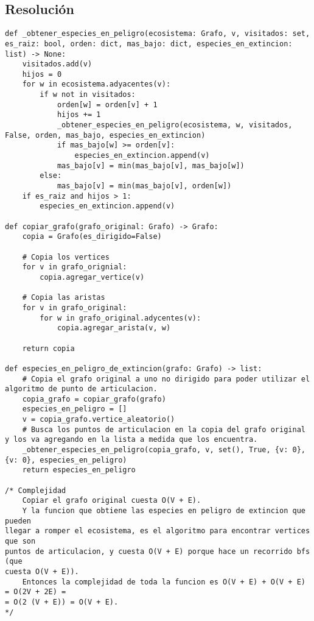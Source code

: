 \documentclass{article}
\begin{document}
\subsection*{Resolución}
\begin{lstlisting}[frame=single]
def _obtener_especies_en_peligro(ecosistema: Grafo, v, visitados: set, es_raiz: bool, orden: dict, mas_bajo: dict, especies_en_extincion: list) -> None:
    visitados.add(v)
    hijos = 0
    for w in ecosistema.adyacentes(v):
        if w not in visitados:
            orden[w] = orden[v] + 1
            hijos += 1
            _obtener_especies_en_peligro(ecosistema, w, visitados, False, orden, mas_bajo, especies_en_extincion)
            if mas_bajo[w] >= orden[v]:
                especies_en_extincion.append(v)
            mas_bajo[v] = min(mas_bajo[v], mas_bajo[w])
        else:
            mas_bajo[v] = min(mas_bajo[v], orden[w])
    if es_raiz and hijos > 1:
        especies_en_extincion.append(v)

def copiar_grafo(grafo_original: Grafo) -> Grafo:
    copia = Grafo(es_dirigido=False)

    # Copia los vertices
    for v in grafo_orignial:
        copia.agregar_vertice(v)

    # Copia las aristas
    for v in grafo_original:
        for w in grafo_original.adycentes(v):
            copia.agregar_arista(v, w)
    
    return copia

def especies_en_peligro_de_extincion(grafo: Grafo) -> list:
    # Copia el grafo original a uno no dirigido para poder utilizar el algoritmo de punto de articulacion.
    copia_grafo = copiar_grafo(grafo) 
    especies_en_peligro = []
    v = copia_grafo.vertice_aleatorio()
    # Busca los puntos de articulacion en la copia del grafo original y los va agregando en la lista a medida que los encuentra.
    _obtener_especies_en_peligro(copia_grafo, v, set(), True, {v: 0}, {v: 0}, especies_en_peligro)
    return especies_en_peligro

/* Complejidad
    Copiar el grafo original cuesta O(V + E).
    Y la funcion que obtiene las especies en peligro de extincion que pueden
llegar a romper el ecosistema, es el algoritmo para encontrar vertices que son
puntos de articulacion, y cuesta O(V + E) porque hace un recorrido bfs (que
cuesta O(V + E)).
    Entonces la complejidad de toda la funcion es O(V + E) + O(V + E) = O(2V + 2E) =
= O(2 (V + E)) = O(V + E).
*/
\end{lstlisting}
\end{document}
